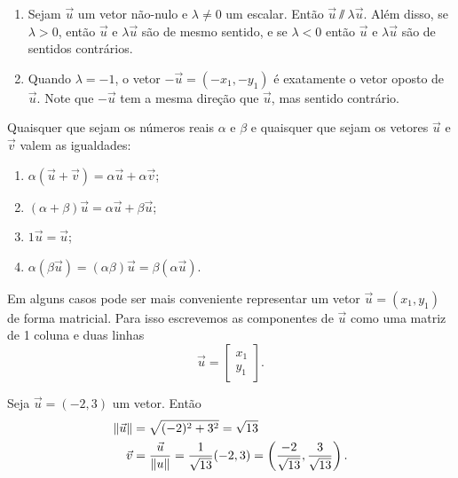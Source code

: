 \documentclass{beamer}
\begin{document}
    \begin{frame}
        \begin{observacao}
            \begin{enumerate}[label=({\roman*})]
                \item Sejam $\vec{u}$ um vetor não-nulo e $\lambda \ne 0$ um escalar. Então $\vec{u} \varparallel\lambda\vec{u}$. Além disso, se $\lambda > 0$, então $\vec{u}$ e $\lambda\vec{u}$ são de mesmo sentido, e se $\lambda < 0$ então $\vec{u}$ e $\lambda\vec{u}$ são de sentidos contrários.
                \item Quando $\lambda = -1$, o vetor $-\vec{u} = (-x_1,-y_1)$  é exatamente o vetor oposto de $\vec{u}$. Note que $-\vec{u}$ tem a mesma direção que $\vec{u}$, mas sentido contrário.
            \end{enumerate}
        \end{observacao}
    \end{frame}

    \begin{frame}
        \begin{propriedades}
          Quaisquer que sejam os números reais $\alpha$ e $\beta$ e quaisquer que sejam os vetores $\vec{u}$ e $\vec{v}$ valem as igualdades:
          \begin{enumerate}[label=({\roman*})]
            \item $\alpha(\vec{u} + \vec{v}) = \alpha\vec{u} + \alpha\vec{v}$;
            \item $(\alpha + \beta)\vec{u} = \alpha\vec{u} + \beta\vec{u}$;
            \item $1\vec{u} = \vec{u}$;
            \item $\alpha(\beta\vec{u}) = (\alpha\beta)\vec{u} = \beta(\alpha\vec{u})$.
          \end{enumerate}
        \end{propriedades}
    \end{frame}

    \begin{frame}
        Em alguns casos pode ser mais conveniente representar um vetor $\vec{u} = (x_1, y_1)$ de forma matricial. Para isso escrevemos as componentes de $\vec{u}$ como uma matriz de 1 coluna e duas linhas
        \[
          \vec{u} = \begin{bmatrix}
            x_1\\y_1
          \end{bmatrix}.
        \]

        \begin{exemplos}
          Seja $\vec{u} = (-2,3)$ um vetor. Então
          \begin{align*}
            \left\Vert{\vec{u}}\right\Vert &= \sqrt{(-2)^2 + 3^2} = \sqrt{13}\\
            \vec{v} &= \dfrac{\vec{u}}{\left\Vert{u}\right\Vert} = \dfrac{1}{\sqrt{13}}(-2,3) = \left(\dfrac{-2}{\sqrt{13}}, \dfrac{3}{\sqrt{13}}\right).
          \end{align*}
        \end{exemplos}
    \end{frame}
\end{document}

